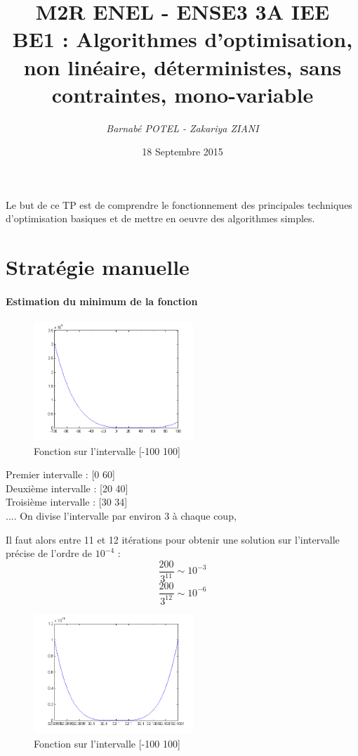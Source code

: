 \documentclass[twocolumn,10pt,a4paper]{article}
\date{18 Septembre 2015}
\begin{document}
\title{\textbf{M2R ENEL - ENSE3 3A IEE} \\ BE1 : Algorithmes d'optimisation, non linéaire, déterministes, sans contraintes, mono-variable}
\author{\textit{Barnabé POTEL - Zakariya ZIANI}}
\maketitle


Le but de ce TP est de comprendre le fonctionnement des principales techniques d'optimisation basiques et de mettre en oeuvre des algorithmes simples.
\section{Stratégie manuelle}
\paragraph{Estimation du minimum de la fonction\\}
\begin{figure}[!h]
\centering
\includegraphics[width=6cm]{courbe1} 
\caption{Fonction sur l'intervalle [-100 100]}
\end{figure}
Premier intervalle : [0 60]\\
Deuxième intervalle : [20 40]\\
Troisième intervalle : [30 34]\\
....
On divise l'intervalle par environ 3 à chaque coup,

Il faut alors entre 11 et 12 itérations pour obtenir une solution sur l'intervalle précise de l'ordre de $10^{-4}$ :
$$\dfrac{200}{3^{11}}\sim 10^{-3} $$
$$\dfrac{200}{3^{12}}\sim 10^{-6} $$

\begin{figure}[!h]
\centering
\includegraphics[width=6cm]{courbe2} 
\caption{Fonction sur l'intervalle [-100 100]}
\end{figure}
\end{document}
